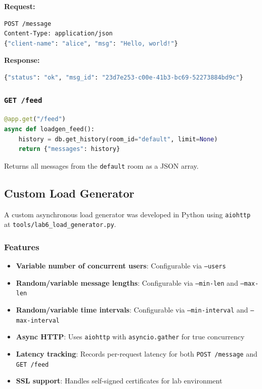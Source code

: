 \documentclass[12pt, a4paper]{article}
\begin{document}
\textbf{Request:}
\begin{lstlisting}[language=bash]
POST /message
Content-Type: application/json
{"client-name": "alice", "msg": "Hello, world!"}
\end{lstlisting}

\textbf{Response:}
\begin{lstlisting}[language=bash]
{"status": "ok", "msg_id": "23d7e253-c00e-41b3-bc69-52273884bd9c"}
\end{lstlisting}

\subsubsection{\texttt{GET /feed}}

\begin{lstlisting}[language=Python, caption={GET /feed endpoint}]
@app.get("/feed")
async def loadgen_feed():
    history = db.get_history(room_id="default", limit=None)
    return {"messages": history}
\end{lstlisting}

Returns all messages from the \texttt{default} room as a JSON array.


\subsection{Custom Load Generator}

A custom asynchronous load generator was developed in Python using \texttt{aiohttp} at \texttt{tools/lab6\_load\_generator.py}.

\subsubsection{Features}

\begin{itemize}
    \item \textbf{Variable number of concurrent users}: Configurable via \texttt{--users}
    \item \textbf{Random/variable message lengths}: Configurable via \texttt{--min-len} and \texttt{--max-len}
    \item \textbf{Random/variable time intervals}: Configurable via \texttt{--min-interval} and \texttt{--max-interval}
    \item \textbf{Async HTTP}: Uses \texttt{aiohttp} with \texttt{asyncio.gather} for true concurrency
    \item \textbf{Latency tracking}: Records per-request latency for both \texttt{POST /message} and \texttt{GET /feed}
    \item \textbf{SSL support}: Handles self-signed certificates for lab environment
\end{itemize}
\end{document}
